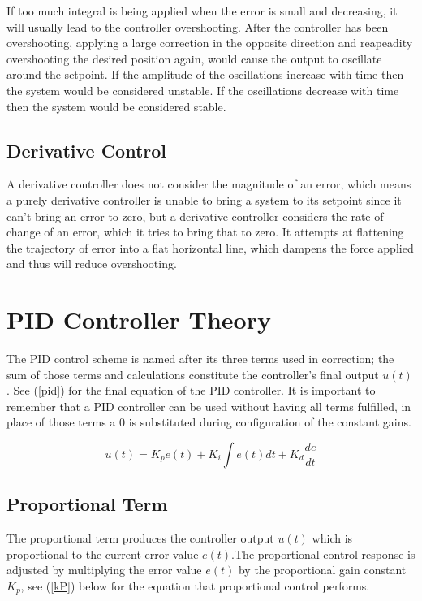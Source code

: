 \documentclass[10pt,conference]{IEEEtran}
\begin{document}
If too much integral is being applied when the error is small and decreasing, it will
usually lead to the controller overshooting. After the controller has been
overshooting, applying a large correction in the opposite direction and reapeadity
overshooting the desired position again, would cause the output to oscillate around
the setpoint. If the amplitude of the oscillations increase with time then the
system would be considered unstable. If the oscillations decrease with time then
the system would be considered stable.

\subsection{Derivative Control}

A derivative controller does not consider the magnitude of an error, which means
a purely derivative controller is unable to bring a system to its setpoint since
it can't bring an error to zero, but a derivative controller considers the rate
of change of an error, which it tries to bring that to zero. It attempts at
flattening the trajectory of error into a flat horizontal line, which dampens
the force applied and thus will reduce overshooting.

\section{PID Controller Theory}

The PID control scheme is named after its three terms used in correction; the sum of those terms and
calculations constitute the controller's final output \(u(t)\). See (\ref{pid}) for the final equation of the
PID controller. It is important to remember that a PID controller can be used without having all terms
fulfilled, in place of those terms a 0 is substituted during configuration of the constant gains.

\begin{equation}
    \displaystyle {u(t)=K_pe(t)+K_i\int e(t)dt + K_d\frac{de}{dt}}\label{pid}
\end{equation}

\subsection{Proportional Term}

The proportional term produces the controller output \(u(t)\) which is proportional to the current
error value \(e(t)\).The proportional control response is adjusted by multiplying the error
value \(e(t)\) by the proportional gain constant \(K_p\), see (\ref{kP}) below for the equation that
proportional control performs.
\end{document}
